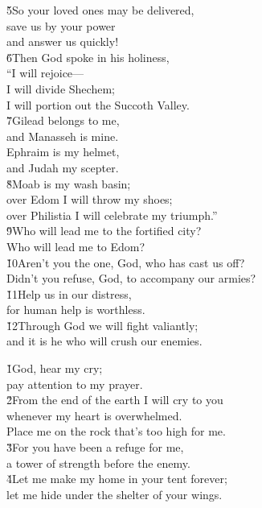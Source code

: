 \begin{poetry}
\poeml \v{5}So your loved ones may be delivered, \\
\poemll    save us by your power \\
\poemlll       and answer us quickly! \\
\poeml \v{6}Then God spoke in his holiness, \\
\poeml ``I will rejoice--- \\
\poemll    I will divide Shechem; \\
\poemlll       I will portion out the Succoth Valley. \\
\poeml \v{7}Gilead belongs to me, \\
\poemll    and Manasseh is mine. \\
\poeml Ephraim is my helmet, \\
\poemll    and Judah my scepter. \\
\poeml \v{8}Moab is my wash basin; \\
\poemll    over Edom I will throw my shoes; \\
\poemlll       over Philistia I will celebrate my triumph.'' \\
\poeml \v{9}Who will lead me to the fortified city? \\
\poemll    Who will lead me to Edom? \\
\poeml \v{10}Aren't you the one, God, who has cast us off? \\
\poemll    Didn't you refuse, God, to accompany our armies? \\
\poeml \v{11}Help us in our distress, \\
\poemll    for human help is worthless. \\
\poeml \v{12}Through God we will fight valiantly; \\
\poemll    and it is he who will crush our enemies.
\end{poetry}

\begin{poetry}
\poeml \v{1}God, hear my cry; \\
\poemll    pay attention to my prayer. \\
\poeml \v{2}From the end of the earth I will cry to you \\
\poemll    whenever my heart is overwhelmed. \\
\poemlll       Place me on the rock that's too high for me. \\
\poeml \v{3}For you have been a refuge for me, \\
\poemll    a tower of strength before the enemy. \\
\poeml \v{4}Let me make my home in your tent forever; \\
\poemll    let me hide under the shelter of your wings.
\end{poetry}

